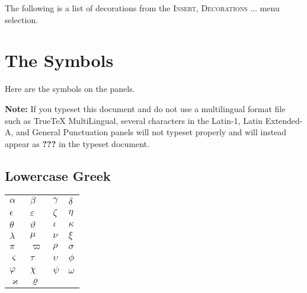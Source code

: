\documentclass{article}
\begin{document}
The following is a list of decorations from the \textsc{Insert, Decorations}%
... menu selection.


\section{The Symbols}

Here are the symbols on the panels.

\textbf{Note: }If you typeset this document and do not use a multilingual
format file such as TrueTeX MultiLingual, several characters in the Latin-1,
Latin Extended-A, and General Punctuation panels will not typeset properly
and will instead appear as \textbf{???} in the typeset document.

\subsection{Lowercase Greek}

\begin{tabular}{llll}
$\alpha $ & $\beta $ & $\gamma $ & $\delta $ \\ 
$\epsilon $ & $\varepsilon $ & $\zeta $ & $\eta $ \\ 
$\theta $ & $\vartheta $ & $\iota $ & $\kappa $ \\ 
$\lambda $ & $\mu $ & $\nu $ & $\xi $ \\ 
$\pi $ & $\varpi $ & $\rho $ & $\sigma $ \\ 
$\varsigma $ & $\tau $ & $\upsilon $ & $\phi $ \\ 
$\varphi $ & $\chi $ & $\psi $ & $\omega $ \\ 
$\varkappa $ & $\varrho $ &  & 
\end{tabular}
\end{document}
